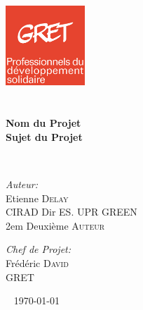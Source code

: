 \begin{titlepage}
\begin{center}

\includegraphics[height=30mm]{./logo/GRET_logo.png}~\logoCirad \\[6cm]


\textsc{\Large }\\[0.5cm]

\HRule \\[0.4cm]

{\huge \bfseries Nom du Projet\\
Sujet du Projet \\[0.4cm] }

\HRule \\[1.5cm]


\begin{minipage}{0.4\textwidth}
\begin{flushleft} \large
\emph{\textcolor{gris}{Auteur:}}\\
Etienne \textsc{Delay}\\
\textcolor{vert}{CIRAD Dir ES. UPR GREEN}\\
\vfill{2em}
Deuxième \textsc{Auteur}\\
\end{flushleft}
\end{minipage}
\begin{minipage}{0.4\textwidth}
\begin{flushright} \large
\emph{\textcolor{gris}{Chef de Projet:}} \\
Frédéric \textsc{David}\\
\textcolor{vert}{GRET}
\end{flushright}
\end{minipage}

\vfill

\logoRF ~ \partnerFr
{\large \today}

\end{center}
\end{titlepage}
